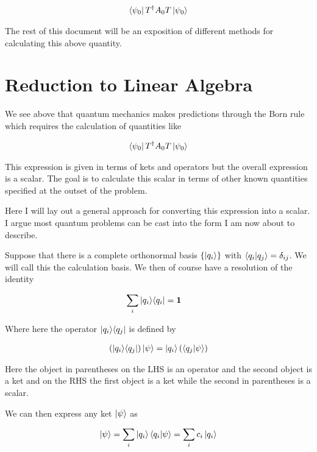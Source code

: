 \documentclass[12pt]{article}
\newcommand{\bv}[1]{\boldsymbol{#1}}
\newcommand{\ketbra}[2]{\Ket{#1}\!\Bra{#2}}
\begin{document}
\begin{align}
\bra{\psi_0}T^{\dag} A_0 T \ket{\psi_0}
\end{align}

The rest of this document will be an exposition of different methods for calculating this above quantity.

\section{Reduction to Linear Algebra}

We see above that quantum mechanics makes predictions through the Born rule which requires the calculation of quantities like

\begin{align}
\bra{\psi_0}T^{\dag}A_0T \ket{\psi_0}
\end{align}

This expression is given in terms of kets and operators but the overall expression is a scalar. The goal is to calculate this scalar in terms of other known quantities specified at the outset of the problem.

Here I will lay out a general approach for converting this expression into a scalar. I argue most quantum problems can be cast into the form I am now about to describe.

Suppose that there is a complete orthonormal basis $\{\ket{q_i}\}$ with $\braket{q_i|q_j} = \delta_{ij}$. We will call this the calculation basis. We then of course have a resolution of the identity

\begin{align}
\sum_{i} \ketbra{q_i}{q_i} &= \bv{1}
\end{align}

Where here the operator $\ketbra{q_i}{q_j}$ is defined by

\begin{align}
\left(\ketbra{q_i}{q_j}\right) \ket{\psi} = \ket{q_i} 
\left(\braket{q_j|\psi}\right)
\end{align}

Here the object in parentheses on the LHS is an operator and the second object is a ket and on the RHS the first object is a ket while the second in parentheses is a scalar.


We can then express any ket $\ket{\psi}$ as

\begin{align}
\ket{\psi} = \sum_{i} \ket{q_i} \braket{q_i|\psi} = \sum_i c_i \ket{q_i}
\end{align}
\end{document}
